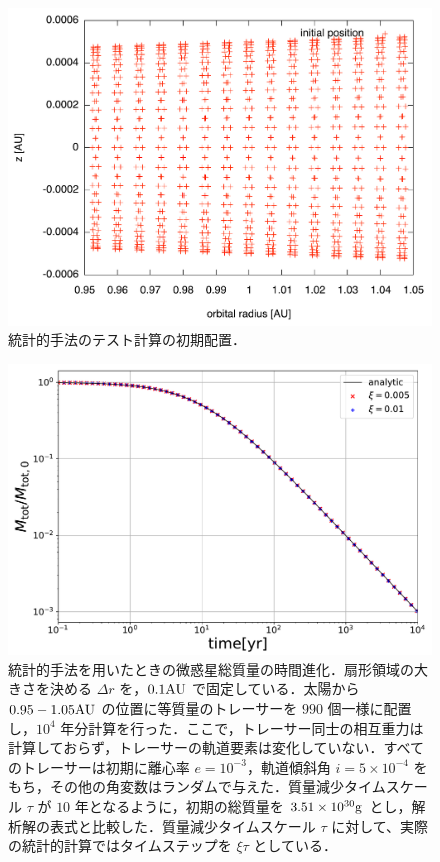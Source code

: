 \documentclass[11pt,a4paper,oneside,onecolumn]{jreport}
\begin{document}
\begin{figure}[H]
 \centering
 \includegraphics[width=12cm]{./image/initial_position_rz.pdf}
 \caption{統計的手法のテスト計算の初期配置．\label{}}
\end{figure}





\begin{figure}[H]
 \centering
 \includegraphics[width=12cm]{./image/MassDepletion.pdf}
 \caption{統計的手法を用いたときの微惑星総質量の時間進化．扇形領域の大きさを決める $\Delta r$ を，$0.1 {\rm AU}$ で固定している．太陽から $0.95 - 1.05 {\rm AU}$ の位置に等質量のトレーサーを $990$ 個一様に配置し，$10^4$ 年分計算を行った．ここで，トレーサー同士の相互重力は計算しておらず，トレーサーの軌道要素は変化していない．すべてのトレーサーは初期に離心率 $e = 10^{-3}$，軌道傾斜角 $i = 5 \times 10^{-4}$ をもち，その他の角変数はランダムで与えた．質量減少タイムスケール $\tau$ が $10$ 年となるように，初期の総質量を $3.51 \times 10^{30} {\rm g}$ とし，解析解の表式\cite{3}と比較した．質量減少タイムスケール $\tau$ に対して、実際の統計的計算ではタイムステップを $\xi \tau$ としている．\label{}}
\end{figure}
\end{document}
